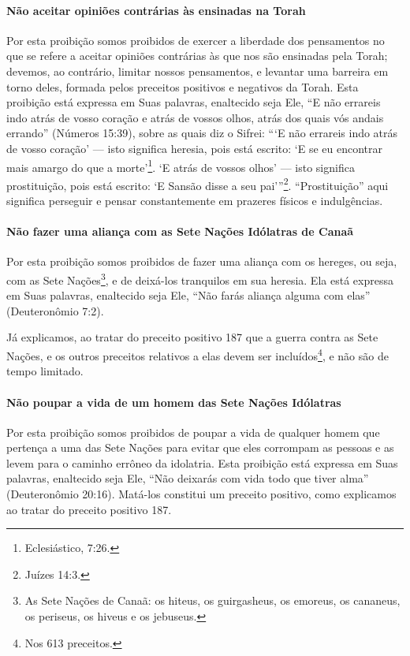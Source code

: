\paragraph{Não aceitar opiniões contrárias às ensinadas na Torah}

Por esta proibição somos proibidos de exercer a liberdade dos
pensamentos no que se refere a aceitar opiniões contrárias às que nos
são ensinadas pela Torah; devemos, ao contrário, limitar nossos
pensamentos, e levantar uma barreira em torno deles, formada pelos
preceitos positivos e negativos da Torah. Esta proibição está expressa
em Suas palavras, enaltecido seja Ele, ``E não errareis indo atrás de
vosso coração e atrás de vossos olhos, atrás dos quais vós andais
errando'' (Números 15:39), sobre as quais diz o Sifrei: ```E não
errareis indo atrás de vosso coração' --- isto significa heresia, pois
está escrito: `E se eu encontrar mais amargo do que a
morte'\footnote{Eclesiástico, 7:26.}. `E atrás de vossos olhos' --- isto
significa prostituição, pois está escrito: `E Sansão disse a seu
pai'''\footnote{Juízes 14:3.}. ``Prostituição'' aqui significa perseguir
e pensar constantemente em prazeres físicos e indulgências.

\paragraph{Não fazer uma aliança com as Sete Nações Idólatras de Canaã}

Por esta proibição somos proibidos de fazer uma aliança com os hereges,
ou seja, com as Sete Nações\footnote{As Sete Nações de Canaã: os hiteus, os guirgasheus, os emoreus, os cananeus, os periseus, os hiveus e os jebuseus.}, e de deixá-los tranquilos em sua heresia. Ela está expressa em Suas palavras,
enaltecido seja Ele, ``Não farás aliança alguma com elas'' (Deuteronômio
7:2).

Já explicamos, ao tratar do preceito positivo 187 que a guerra contra as Sete Nações, e os outros preceitos relativos a elas devem ser
incluídos\footnote{Nos 613 preceitos.}, e não são de tempo limitado.

\paragraph{Não poupar a vida de um homem das Sete Nações Idólatras}

Por esta proibição somos proibidos de poupar a vida de qualquer homem
que pertença a uma das Sete Nações para evitar que eles corrompam as
pessoas e as levem para o caminho errôneo da idolatria. Esta proibição
está expressa em Suas palavras, enaltecido seja Ele, ``Não deixarás com
vida todo que tiver alma'' (Deuteronômio 20:16). Matá-los constitui um
preceito positivo, como explicamos ao tratar do preceito positivo 187.

